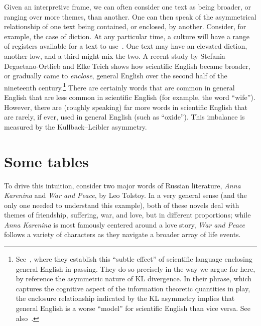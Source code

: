 Given an interpretive frame, we can often consider one text as being broader, or ranging over more themes, than another. One can then speak of the asymmetrical relationship of one text being contained, or enclosed, by another. Consider, for example, the case of diction. At any particular time, a culture will have a range of registers available for a text to use~\autocite{bachtin2011Dialogic}. One text may have an elevated diction, another low, and a third might mix the two. A recent study by Stefania Degaetano-Ortlieb and Elke Teich shows how scientific English became broader, or gradually came to \textit{enclose}, general English over the second half of the nineteenth century.\footnote{See~, where they establish this ``subtle effect'' of scientific language enclosing general English in passing. They do so precisely in the way we argue for here, by reference the asymmetric nature of KL divergence. In their phrase, which captures the cognitive aspect of the information theoretic quantities in play, the enclosure relationship indicated by the KL asymmetry implies that general English is a worse ``model'' for scientific English than vice versa. See also~.} There are certainly words that are common in general English that are less common in scientific English (for example, the word ``wife''). However, there are (roughly speaking) far more words in scientific English that are rarely, if ever, used in general English (such as ``oxide''). This imbalance is measured by the Kullback--Leibler asymmetry.

\section{Some tables}

To drive this intuition, consider two major words of Russian literature, \emph{Anna Karenina} and \emph{War and Peace}, by Leo Tolstoy. In a very general sense (and the only one needed to understand this example), both of these novels deal with themes of friendship, suffering, war, and love, but in different proportions; while \emph{Anna Karenina} is most famously centered around a love story, \emph{War and Peace} follows a variety of characters as they navigate a broader array of life events.

